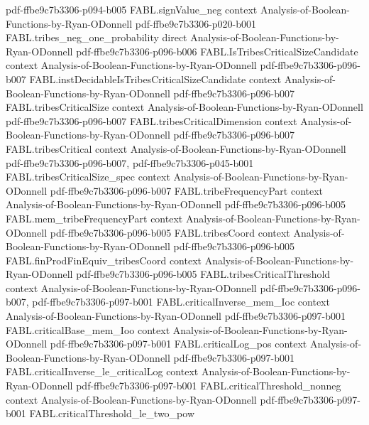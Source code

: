 \begin{theorem}
  {pdf-ffbe9c7b3306-p094-b005}
\proofstep
  {FABL.signValue_neg}
  {context}
  {Analysis-of-Boolean-Functions-by-Ryan-ODonnell}
  {pdf-ffbe9c7b3306-p020-b001}
\proofstep
  {FABL.tribes_neg_one_probability}
  {direct}
  {Analysis-of-Boolean-Functions-by-Ryan-ODonnell}
  {pdf-ffbe9c7b3306-p096-b006}
\proofstep
  {FABL.IsTribesCriticalSizeCandidate}
  {context}
  {Analysis-of-Boolean-Functions-by-Ryan-ODonnell}
  {pdf-ffbe9c7b3306-p096-b007}
\proofstep
  {FABL.instDecidableIsTribesCriticalSizeCandidate}
  {context}
  {Analysis-of-Boolean-Functions-by-Ryan-ODonnell}
  {pdf-ffbe9c7b3306-p096-b007}
\proofstep
  {FABL.tribesCriticalSize}
  {context}
  {Analysis-of-Boolean-Functions-by-Ryan-ODonnell}
  {pdf-ffbe9c7b3306-p096-b007}
\proofstep
  {FABL.tribesCriticalDimension}
  {context}
  {Analysis-of-Boolean-Functions-by-Ryan-ODonnell}
  {pdf-ffbe9c7b3306-p096-b007}
\proofstep
  {FABL.tribesCritical}
  {context}
  {Analysis-of-Boolean-Functions-by-Ryan-ODonnell}
  {pdf-ffbe9c7b3306-p096-b007,
    pdf-ffbe9c7b3306-p045-b001}
\proofstep
  {FABL.tribesCriticalSize_spec}
  {context}
  {Analysis-of-Boolean-Functions-by-Ryan-ODonnell}
  {pdf-ffbe9c7b3306-p096-b007}
\proofstep
  {FABL.tribeFrequencyPart}
  {context}
  {Analysis-of-Boolean-Functions-by-Ryan-ODonnell}
  {pdf-ffbe9c7b3306-p096-b005}
\proofstep
  {FABL.mem_tribeFrequencyPart}
  {context}
  {Analysis-of-Boolean-Functions-by-Ryan-ODonnell}
  {pdf-ffbe9c7b3306-p096-b005}
\proofstep
  {FABL.tribesCoord}
  {context}
  {Analysis-of-Boolean-Functions-by-Ryan-ODonnell}
  {pdf-ffbe9c7b3306-p096-b005}
\proofstep
  {FABL.finProdFinEquiv_tribesCoord}
  {context}
  {Analysis-of-Boolean-Functions-by-Ryan-ODonnell}
  {pdf-ffbe9c7b3306-p096-b005}
\proofstep
  {FABL.tribesCriticalThreshold}
  {context}
  {Analysis-of-Boolean-Functions-by-Ryan-ODonnell}
  {pdf-ffbe9c7b3306-p096-b007,
    pdf-ffbe9c7b3306-p097-b001}
\proofstep
  {FABL.criticalInverse_mem_Ioc}
  {context}
  {Analysis-of-Boolean-Functions-by-Ryan-ODonnell}
  {pdf-ffbe9c7b3306-p097-b001}
\proofstep
  {FABL.criticalBase_mem_Ioo}
  {context}
  {Analysis-of-Boolean-Functions-by-Ryan-ODonnell}
  {pdf-ffbe9c7b3306-p097-b001}
\proofstep
  {FABL.criticalLog_pos}
  {context}
  {Analysis-of-Boolean-Functions-by-Ryan-ODonnell}
  {pdf-ffbe9c7b3306-p097-b001}
\proofstep
  {FABL.criticalInverse_le_criticalLog}
  {context}
  {Analysis-of-Boolean-Functions-by-Ryan-ODonnell}
  {pdf-ffbe9c7b3306-p097-b001}
\proofstep
  {FABL.criticalThreshold_nonneg}
  {context}
  {Analysis-of-Boolean-Functions-by-Ryan-ODonnell}
  {pdf-ffbe9c7b3306-p097-b001}
\proofstep
  {FABL.criticalThreshold_le_two_pow}

\end{theorem}
